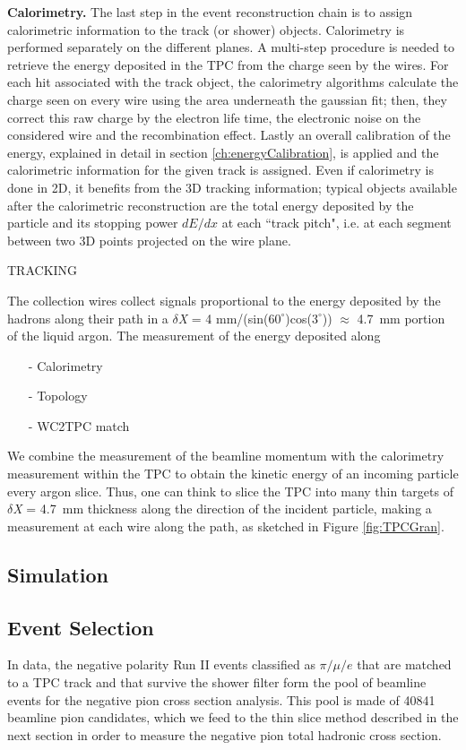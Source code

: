\documentclass[aps,prl,twocolumn,showpacs,superscriptaddress,groupedaddress]{revtex4}  %
\begin{document}
\textbf{Calorimetry.} The last step in the event reconstruction chain is to assign calorimetric information to the track (or shower) objects. Calorimetry is performed separately on the different planes. A multi-step procedure is needed to retrieve the energy deposited in the TPC  from the charge seen by the wires.
For each hit associated with the track object, the calorimetry algorithms calculate the charge seen on every wire using the area underneath the gaussian fit; then, they correct this raw charge by the electron life time, the electronic noise on the considered wire and the recombination effect. Lastly an overall calibration of the energy, explained in detail in section \ref{ch:energyCalibration}, is applied and the calorimetric information for the given track is assigned.
Even if calorimetry is done in 2D, it benefits from the 3D tracking information; typical objects available after the calorimetric reconstruction are the total energy deposited by the particle and its stopping power $dE/dx$ at each ``track pitch", i.e. at each segment between two 3D points projected on the wire plane.




TRACKING


The collection wires collect signals proportional to the energy deposited by the hadrons along their path in a  $\delta${\emph{X}} = 4 mm/(sin($60^{\circ}$)cos($3^{\circ}$)) $\approx$ 4.7~mm portion of the liquid argon. The measurement of the energy deposited along

\begin{itemize}
\item[-] Calorimetry
\item[-] Topology
\item[-] WC2TPC match
\end{itemize}

We combine the measurement of the beamline momentum with the calorimetry measurement within the TPC to obtain the kinetic energy of an incoming particle every argon slice.
Thus, one can think to slice the TPC into many thin targets of $\delta${\emph{X}} = 4.7~mm thickness along the direction of the incident particle, making a measurement at each wire along the path, as sketched in Figure \ref{fig:TPCGran}.


\subsection{\label{sec:Simulation}Simulation}
\subsection{\label{sec:EventSelection}Event Selection}
In data, the negative polarity Run II events classified as $\pi/\mu/e$ that are matched to a TPC track and that survive the shower filter form the pool of beamline events for the negative pion cross section analysis. This pool is made of 40841 beamline pion candidates, which we feed to the thin slice method described in the next section in order to measure the negative pion total hadronic cross section. 
\end{document}
